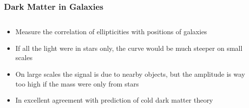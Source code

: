 \documentclass{beamer}
\begin{document}
\frame
{

    \frametitle{Dark Matter in Galaxies}


    \begin{columns}
        \begin{column}{0.5\textwidth}
            \begin{itemize}

                \item Measure the correlation of ellipticities with
                    positions of galaxies

                \item If all the light were in stars only, the curve would
                    be much steeper on small scales

                \item On large scales the signal is due to nearby objects, but
                    the amplitude is way too high if the mass were only from
                    stars

                \item In excellent agreement with prediction of cold dark
                    matter theory

            \end{itemize}


\end{column}
\end{columns}}
\end{document}
